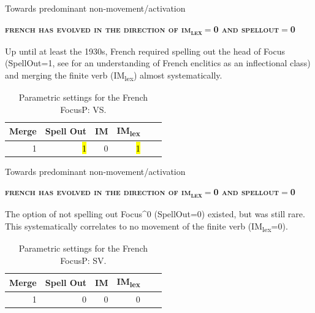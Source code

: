 \documentclass[lesson_slides]{subfiles}
\begin{document}
\begin{frame}[c]{Towards predominant non-movement/activation}

    \textbf{\textsc{french has evolved in the direction of im\textsubscript{lex}$=$0 and spellout$=$0}}

    \noindent Up until at least the 1930s, French required spelling out the head of Focus (SpellOut=1, see \citealt{roberts2017} for an understanding of French enclitics as an inflectional class) and merging the finite verb (IM\textsubscript{lex}) almost systematically.

    \begin{table}[H]
        \centering
        \begin{tabular}{|r|r|r|r|r|r|}
        \hline
        Merge & Spell Out & IM  & IM\textsubscript{lex} \\
        \hline
        1 & \hl{1} & 0 & \hl{1} \\
        \hline
        \end{tabular}
        \caption{\label{tab:samp}Parametric settings for the French FocusP: VS.}
    \end{table}
  
\end{frame}
\begin{frame}[c]{Towards predominant non-movement/activation}

    \vspace*{-10mm}
    \textbf{\textsc{french has evolved in the direction of im\textsubscript{lex}$=$0 and spellout$=$0}} \pause

\noindent The option of not spelling out Focus^0 (SpellOut=0) existed, but was still rare. This systematically correlates to no movement of the finite verb (IM\textsubscript{lex}=0). \pause

\begin{table}[H]
    \centering
    \begin{tabular}{|r|r|r|r|r|r|}
    \hline
    Merge & Spell Out & IM & IM\textsubscript{lex} \\
    \hline
    1 & 0 & 0 & 0 \\
    \hline
    \end{tabular}
    \caption{\label{tab:samp}Parametric settings for the French FocusP: SV.}
\end{table}
  
\end{frame}
\end{document}
